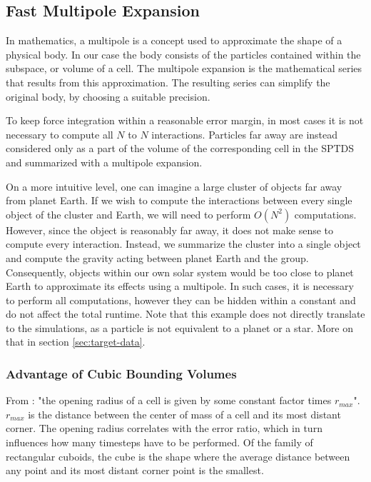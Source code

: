 \documentclass[]{article}
\begin{document}
\subsection{Fast Multipole Expansion} \label{sec:multipole}

In mathematics, a multipole is a concept used to approximate the shape of a physical body. In our case the body consists of the particles contained within the subspace, or volume of a cell. The multipole expansion is the mathematical series that results from this approximation. The resulting series can simplify the original body, by choosing a suitable precision.

To keep force integration within a reasonable error margin, in most cases it is not necessary to compute all $N$ to $N$ interactions. Particles far away are instead considered only as a part of the volume of the corresponding cell in the SPTDS and summarized with a multipole expansion. 

On a more intuitive level, one can imagine a large cluster of objects far away from planet Earth. If we wish to compute the interactions between every single object of the cluster and Earth, we will need to perform $O(N^2)$ computations. However, since the object is reasonably far away, it does not make sense to compute every interaction. Instead, we summarize the cluster into a single object and compute the gravity acting between planet Earth and the group. Consequently, objects within our own solar system would be too close to planet Earth to approximate its effects using a multipole. In such cases, it is necessary to perform all computations, however they can be hidden within a constant and do not affect the total runtime. 
Note that this example does not directly translate to the simulations, as a particle is not equivalent to a planet or a star. More on that in section \ref{sec:target-data}.


\subsubsection{Advantage of Cubic Bounding Volumes}\label{sec:cubic}

From \cite{Stadel2001}: "the opening radius of a cell is given by some constant factor times $r_{max}$". $r_{max}$ is the distance between the center of mass of a cell and its most distant corner. The opening radius correlates with the error ratio, which in turn influences how many timesteps have to be performed. Of the family of rectangular cuboids, the cube is the shape where the average distance between any point and its most distant corner point is the smallest. 
\end{document}
